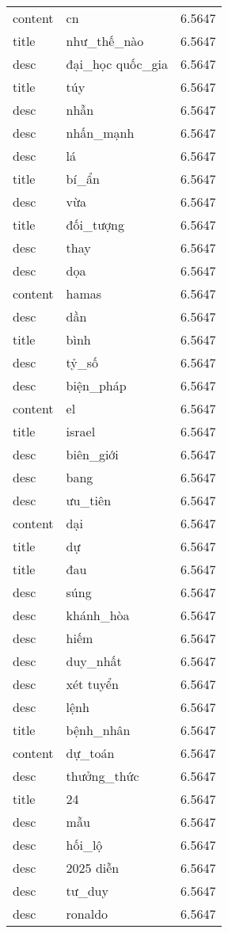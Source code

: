 \documentclass{article}
\begin{document}
\begin{tabular}{lll}
content & cn & 6.5647\\
title & như\_thế\_nào & 6.5647\\
desc & đại\_học quốc\_gia & 6.5647\\
title & túy & 6.5647\\
desc & nhẫn & 6.5647\\
desc & nhấn\_mạnh & 6.5647\\
desc & lá & 6.5647\\
title & bí\_ẩn & 6.5647\\
desc & vừa & 6.5647\\
title & đối\_tượng & 6.5647\\
desc & thay & 6.5647\\
desc & dọa & 6.5647\\
content & hamas & 6.5647\\
desc & dần & 6.5647\\
title & bình & 6.5647\\
desc & tỷ\_số & 6.5647\\
desc & biện\_pháp & 6.5647\\
content & el & 6.5647\\
title & israel & 6.5647\\
desc & biên\_giới & 6.5647\\
desc & bang & 6.5647\\
desc & ưu\_tiên & 6.5647\\
content & dại & 6.5647\\
title & dự & 6.5647\\
title & đau & 6.5647\\
desc & súng & 6.5647\\
desc & khánh\_hòa & 6.5647\\
desc & hiếm & 6.5647\\
desc & duy\_nhất & 6.5647\\
desc & xét tuyển & 6.5647\\
desc & lệnh & 6.5647\\
title & bệnh\_nhân & 6.5647\\
content & dự\_toán & 6.5647\\
desc & thưởng\_thức & 6.5647\\
title & 24 & 6.5647\\
desc & mẫu & 6.5647\\
desc & hối\_lộ & 6.5647\\
desc & 2025 diễn & 6.5647\\
desc & tư\_duy & 6.5647\\
desc & ronaldo & 6.5647\\

\end{tabular}
\end{document}
